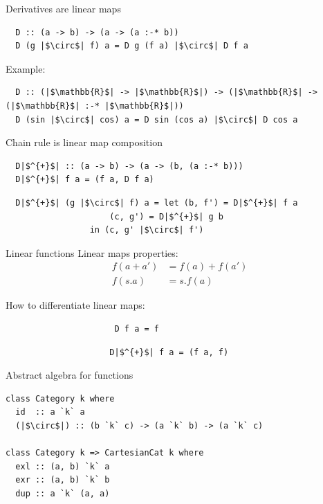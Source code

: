 \documentclass[12pt]{beamer}
\begin{document}
\begin{frame}[fragile]{Derivatives are linear maps}

\begin{verbatim}
  D :: (a -> b) -> (a -> (a :-* b))
  D (g |$\circ$| f) a = D g (f a) |$\circ$| D f a
\end{verbatim}
  \pause
  Example:
\begin{verbatim}
  D :: (|$\mathbb{R}$| -> |$\mathbb{R}$|) -> (|$\mathbb{R}$| -> (|$\mathbb{R}$| :-* |$\mathbb{R}$|))
  D (sin |$\circ$| cos) a = D sin (cos a) |$\circ$| D cos a
\end{verbatim}
\end{frame}

\begin{frame}[fragile]{Chain rule is linear map composition}
\begin{verbatim}
  D|$^{+}$| :: (a -> b) -> (a -> (b, (a :-* b)))
  D|$^{+}$| f a = (f a, D f a)
\end{verbatim}

\begin{verbatim}
  D|$^{+}$| (g |$\circ$| f) a = let (b, f') = D|$^{+}$| f a
                     (c, g') = D|$^{+}$| g b
                 in (c, g' |$\circ$| f')
\end{verbatim}
\end{frame}

\begin{frame}[fragile]{Linear functions}
  Linear maps properties:
  \begin{align*}
    f(a + a') &= f(a) + f(a')\\
    f(s . a) &= s . f(a) 
  \end{align*}

\pause{}
How to differentiate linear maps:
\begin{verbatim}
                      D f a = f
\end{verbatim}
\pause
\begin{verbatim}
                     D|$^{+}$| f a = (f a, f)
\end{verbatim}
\end{frame}

\begin{frame}[fragile]{Abstract algebra for functions}
\begin{verbatim}
class Category k where
  id  :: a `k` a
  (|$\circ$|) :: (b `k` c) -> (a `k` b) -> (a `k` c)

class Category k => CartesianCat k where
  exl :: (a, b) `k` a
  exr :: (a, b) `k` b
  dup :: a `k` (a, a)
\end{verbatim}
\end{frame}
\end{document}
